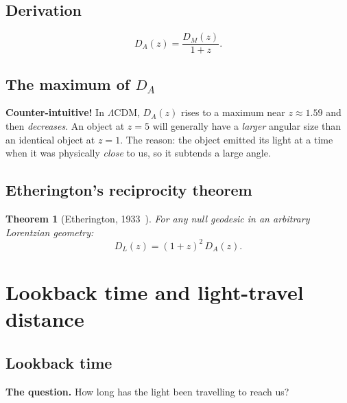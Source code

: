\documentclass[11pt,a4paper,openany]{report}
\newtheorem{theorem}{Theorem}[chapter]
\begin{document}
\section{Derivation}

\begin{equation}
\boxed{\;D_{A}(z) = \frac{D_{M}(z)}{1+z}.\;}
\label{eq:DA}
\end{equation}

\section{The maximum of \texorpdfstring{$D_{A}$}{D\_A}}

\begin{tcolorbox}[warning]
\textbf{Counter-intuitive!} In $\Lambda$CDM, $D_{A}(z)$ rises to a maximum near
$z \approx 1.59$ and then \emph{decreases}. An object at $z = 5$ will generally
have a \emph{larger} angular size than an identical object at $z = 1$. The
reason: the object emitted its light at a time when it was physically
\emph{close} to us, so it subtends a large angle.
\end{tcolorbox}

\section{Etherington's reciprocity theorem}

\begin{theorem}[Etherington, 1933~\cite{Etherington1933}]
For any null geodesic in an arbitrary Lorentzian geometry:
\begin{equation}
\boxed{\;D_{L}(z) = (1+z)^{2}\,D_{A}(z).\;}
\label{eq:Etherington}
\end{equation}
\end{theorem}

\chapter{Lookback time and light-travel distance}
\label{chap:Dlt}

\section{Lookback time}

\begin{tcolorbox}[plain]
\textbf{The question.} How long has the light been travelling to reach us?
\end{tcolorbox}
\end{document}
